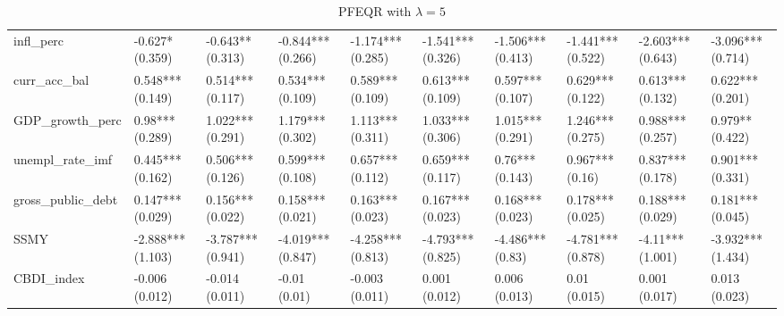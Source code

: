 \begin{table}[H]
\begin{adjustbox}{totalheight=3in, width=\columnwidth }
\begin{subtable}[c]{1.1\textwidth}
{\begin{tabular}{llllllllll}
  infl\_perc & -0.627* (0.359) & -0.643** (0.313) & -0.844*** (0.266) & -1.174*** (0.285) & -1.541*** (0.326) & -1.506*** (0.413) & -1.441*** (0.522) & -2.603*** (0.643) & -3.096*** (0.714) \\ 
  curr\_acc\_bal & 0.548*** (0.149) & 0.514*** (0.117) & 0.534*** (0.109) & 0.589*** (0.109) & 0.613*** (0.109) & 0.597*** (0.107) & 0.629*** (0.122) & 0.613*** (0.132) & 0.622*** (0.201) \\ 
  GDP\_growth\_perc & 0.98*** (0.289) & 1.022*** (0.291) & 1.179*** (0.302) & 1.113*** (0.311) & 1.033*** (0.306) & 1.015*** (0.291) & 1.246*** (0.275) & 0.988*** (0.257) & 0.979** (0.422) \\ 
  unempl\_rate\_imf & 0.445*** (0.162) & 0.506*** (0.126) & 0.599*** (0.108) & 0.657*** (0.112) & 0.659*** (0.117) & 0.76*** (0.143) & 0.967*** (0.16) & 0.837*** (0.178) & 0.901*** (0.331) \\ 
  gross\_public\_debt & 0.147*** (0.029) & 0.156*** (0.022) & 0.158*** (0.021) & 0.163*** (0.023) & 0.167*** (0.023) & 0.168*** (0.023) & 0.178*** (0.025) & 0.188*** (0.029) & 0.181*** (0.045) \\ 
  SSMY & -2.888*** (1.103) & -3.787*** (0.941) & -4.019*** (0.847) & -4.258*** (0.813) & -4.793*** (0.825) & -4.486*** (0.83) & -4.781*** (0.878) & -4.11*** (1.001) & -3.932*** (1.434) \\ 
  CBDI\_index & -0.006 (0.012) & -0.014 (0.011) & -0.01 (0.01) & -0.003 (0.011) & 0.001 (0.012) & 0.006 (0.013) & 0.01 (0.015) & 0.001 (0.017) & 0.013 (0.023) \\ 
   \bottomrule
\end{tabular}}
\end{subtable}
\end{adjustbox}
\\
 \begin{adjustbox}{totalheight=3in, width=\columnwidth } 
\begin{subtable}[c]{1.1\textwidth}
\caption{PFEQR with $\lambda = 5$}
\centering
{}
\end{subtable}
\end{adjustbox}
\end{table}
